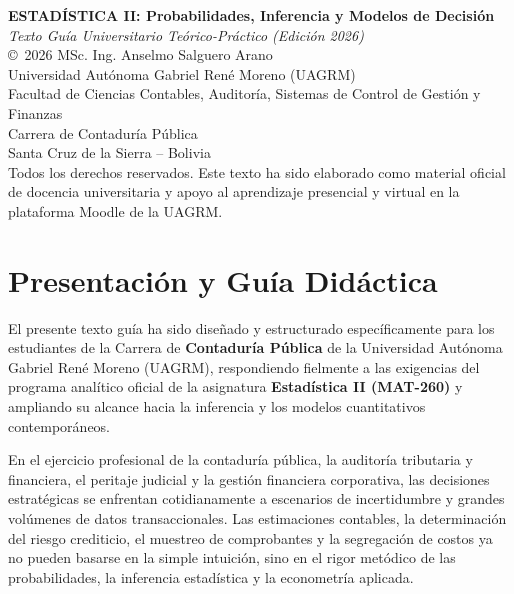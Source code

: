 \documentclass[11pt,twoside,openright]{book}
\begin{document}
\frontmatter



\thispagestyle{empty}
\vspace*{12cm}
\begin{flushleft}
    \textbf{ESTADÍSTICA II: Probabilidades, Inferencia y Modelos de Decisión}\\
    \textit{Texto Guía Universitario Teórico-Práctico (Edición 2026)}\\[0.3cm]
    \copyright\ 2026 MSc. Ing. Anselmo Salguero Arano\\
    Universidad Autónoma Gabriel René Moreno (UAGRM)\\
    Facultad de Ciencias Contables, Auditoría, Sistemas de Control de Gestión y Finanzas\\
    Carrera de Contaduría Pública\\
    Santa Cruz de la Sierra -- Bolivia\\[0.4cm]
    \small Todos los derechos reservados. Este texto ha sido elaborado como material oficial de docencia universitaria y apoyo al aprendizaje presencial y virtual en la plataforma Moodle de la UAGRM.
\end{flushleft}
\clearpage

\chapter*{Presentación y Guía Didáctica}

El presente texto guía ha sido diseñado y estructurado específicamente para los estudiantes de la Carrera de \textbf{Contaduría Pública} de la Universidad Autónoma Gabriel René Moreno (UAGRM), respondiendo fielmente a las exigencias del programa analítico oficial de la asignatura \textbf{Estadística II (MAT-260)} y ampliando su alcance hacia la inferencia y los modelos cuantitativos contemporáneos.

En el ejercicio profesional de la contaduría pública, la auditoría tributaria y financiera, el peritaje judicial y la gestión financiera corporativa, las decisiones estratégicas se enfrentan cotidianamente a escenarios de incertidumbre y grandes volúmenes de datos transaccionales. Las estimaciones contables, la determinación del riesgo crediticio, el muestreo de comprobantes y la segregación de costos ya no pueden basarse en la simple intuición, sino en el rigor metódico de las probabilidades, la inferencia estadística y la econometría aplicada.
\end{document}
